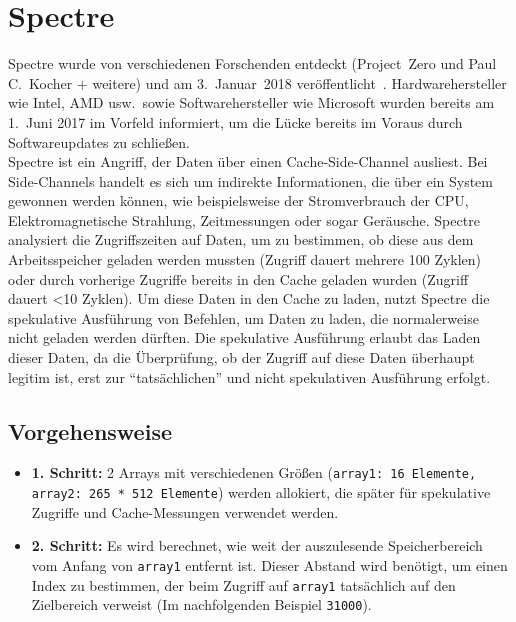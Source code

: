 \section{Spectre}
\label{sec:spectre}

Spectre wurde von verschiedenen Forschenden entdeckt (Project~Zero und Paul C.~Kocher + weitere) und am 3.~Januar~2018 veröffentlicht~\cite{kocher2018spectre}.
Hardwarehersteller wie Intel, AMD usw.~sowie Softwarehersteller wie Microsoft wurden bereits am 1.~Juni 2017 im Vorfeld informiert, um die Lücke bereits im Voraus durch Softwareupdates zu schließen. \\
Spectre ist ein Angriff, der Daten über einen Cache-Side-Channel ausliest.
Bei Side-Channels handelt es sich um indirekte Informationen, die über ein System gewonnen werden können, wie beispielsweise der Stromverbrauch der CPU, Elektromagnetische Strahlung, Zeitmessungen oder sogar Geräusche.
Spectre analysiert die Zugriffszeiten auf Daten, um zu bestimmen, ob diese aus dem Arbeitsspeicher geladen werden mussten (Zugriff dauert mehrere 100 Zyklen) oder durch vorherige Zugriffe bereits in den Cache geladen wurden (Zugriff dauert <10 Zyklen).
Um diese Daten in den Cache zu laden, nutzt Spectre die spekulative Ausführung von Befehlen, um Daten zu laden, die normalerweise nicht geladen werden dürften.
Die spekulative Ausführung erlaubt das Laden dieser Daten, da die Überprüfung, ob der Zugriff auf diese Daten überhaupt legitim ist, erst zur \enquote{tatsächlichen} und nicht spekulativen Ausführung erfolgt.

\subsection{Vorgehensweise \cite{kocher2018spectre}}
\label{subsec:spectre_vorgehensweise}
\begin{itemize}
	\item \textbf{1. Schritt:} 2 Arrays mit verschiedenen Größen (\texttt{array1: 16 Elemente, array2: 265 * 512 Elemente}) werden allokiert, die später für spekulative Zugriffe und Cache-Messungen verwendet werden.
	\item \textbf{2. Schritt:} Es wird berechnet, wie weit der auszulesende Speicherbereich vom Anfang von \texttt{array1} entfernt ist.
	      Dieser Abstand wird benötigt, um einen Index zu bestimmen, der beim Zugriff auf \texttt{array1} tatsächlich auf den Zielbereich verweist (Im nachfolgenden Beispiel \texttt{31000}).
\end{itemize}

